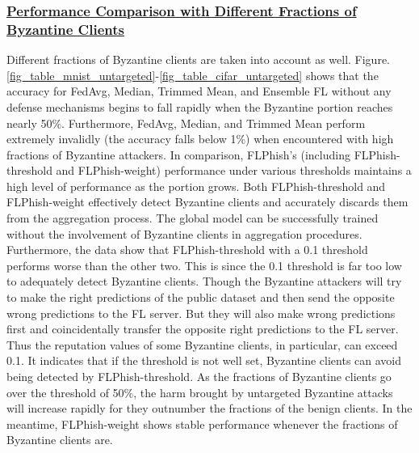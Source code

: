 \documentclass[journal]{IEEEtran}
\begin{document}
    \subsubsection{\ul{Performance Comparison with Different Fractions of Byzantine Clients}} Different fractions of Byzantine clients are taken into account as well. Figure. \ref{fig_table_mnist_untargeted}-\ref{fig_table_cifar_untargeted} shows that the accuracy for FedAvg, Median, Trimmed Mean, and Ensemble FL without any defense mechanisms begins to fall rapidly when the Byzantine portion reaches nearly 50\%. Furthermore, FedAvg, Median, and Trimmed Mean perform extremely invalidly (the accuracy falls below 1\%) when encountered with high fractions of Byzantine attackers. In comparison, FLPhish's (including FLPhish-threshold and FLPhish-weight) performance under various thresholds maintains a high level of performance as the portion grows. Both FLPhish-threshold and FLPhish-weight effectively detect Byzantine clients and accurately discards them from the aggregation process. The global model can be successfully trained without the involvement of Byzantine clients in aggregation procedures. Furthermore, the data show that FLPhish-threshold with a 0.1 threshold performs worse than the other two. This is since the 0.1 threshold is far too low to adequately detect Byzantine clients. Though the Byzantine attackers will try to make the right predictions of the public dataset and then send the opposite wrong predictions to the FL server. But they will also make wrong predictions first and coincidentally transfer the opposite right predictions to the FL server. Thus the reputation values of some Byzantine clients, in particular, can exceed 0.1. It indicates that if the threshold is not well set, Byzantine clients can avoid being detected by FLPhish-threshold. As the fractions of Byzantine clients go over the threshold of 50\%, the harm brought by untargeted Byzantine attacks will increase rapidly for they outnumber the fractions of the benign clients. In the meantime, FLPhish-weight shows stable performance whenever the fractions of Byzantine clients are.
\end{document}
